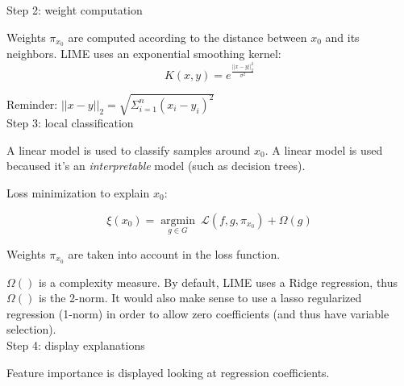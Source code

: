 Step 2: weight computation

Weights $\pi_{x_0}$ are computed according to the distance between $x_0$ and its neighbors. LIME uses an exponential smoothing kernel:
$$K(x,y) = e^{\frac{||x-y||^2_2}{\sigma^2}}$$

Reminder: $||x-y||_2 = \sqrt{\Sigma_{i=1}^n (x_i - y_i)^2}$ \\

Step 3: local classification

A linear model is used to classify samples around $x_0$. A linear model is used becaused it's an \textit{interpretable} model (such as decision trees).

Loss minimization to explain $x_0$:

$$\xi(x_0) = \underset{g \in G}{\operatorname{argmin}} ~\mathcal{L} (f, g, \pi_{x_0}) + \Omega(g)$$

Weights $\pi_{x_0}$ are taken into account in the loss function.

$\Omega()$ is a complexity measure. By default, LIME uses a Ridge regression, thus $\Omega()$ is the 2-norm. It would also make sense to use a lasso regularized regression (1-norm) in order to allow zero coefficients (and thus have variable selection). \\

Step 4: display explanations

Feature importance is displayed looking at regression coefficients. \\ \\